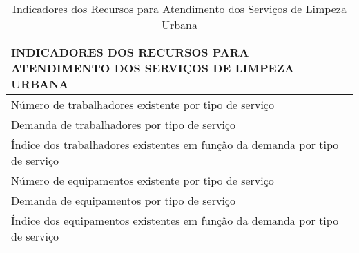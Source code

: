 \begin{table}[h!]
  \centering
  \caption{Indicadores dos Recursos para Atendimento dos Serviços de Limpeza Urbana}
    \begin{tabular}{|p{22.645em}|}
    \toprule
    \rowcolor[rgb]{ .776,  .878,  .706} INDICADORES DOS RECURSOS PARA ATENDIMENTO DOS SERVIÇOS DE LIMPEZA URBANA \\
    \midrule
    Número de trabalhadores existente por tipo de serviço \\
    \midrule
    Demanda de trabalhadores por tipo de serviço \\
    \midrule
    Índice dos trabalhadores existentes em função da demanda por tipo de serviço \\
    \midrule
    Número de equipamentos existente por tipo de serviço \\
    \midrule
    Demanda de equipamentos por tipo de serviço \\
    \midrule
    Índice dos equipamentos existentes em função da demanda por tipo de serviço \\
    \bottomrule
    \end{tabular}%
  \label{tab:ind_recursos_slu}%
\end{table}%
